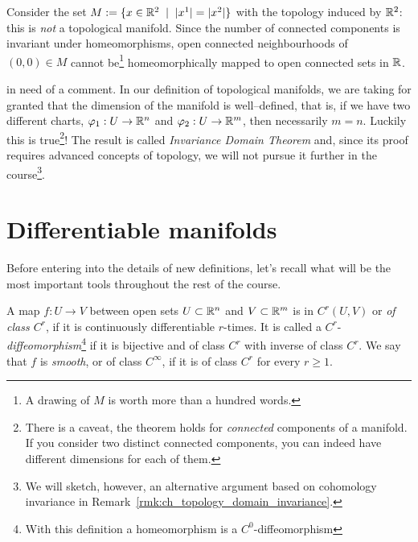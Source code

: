 \begin{example}
  Consider the set $M := \{ x\in\mathbb{R}^2 \;\mid\; |x^1| = |x^2| \}$ with the topology induced by $\mathbb{R}^2$:
  this is \emph{not} a topological manifold.
  Since the number of connected components is invariant under homeomorphisms, open connected neighbourhoods of $(0,0)\in M$ cannot be\footnote{A drawing of $M$ is worth more than a hundred words.} homeomorphically mapped to open connected sets in $\mathbb{R}$.
\end{example}

 in need of a comment.
In our definition of topological manifolds, we are taking for granted that the dimension of the manifold is well--defined, that is, if we have two different charts, $\varphi_1: U \to \mathbb{R}^n$ and $\varphi_2: U \to \mathbb{R}^m$, then necessarily $m=n$. Luckily this is true\footnote{There is a caveat, the theorem holds for \emph{connected} components of a manifold. If you consider two distinct connected components, you can indeed have different dimensions for each of them.}! The result is called \emph{Invariance Domain Theorem} and, since its proof requires advanced concepts of topology, we will not pursue it further in the course\footnote{We will sketch, however, an alternative argument based on cohomology invariance in Remark~\ref{rmk:ch_topology_domain_invariance}.}.

\section{Differentiable manifolds}

Before entering into the details of new definitions, let's recall what will be the most important tools throughout the rest of the course.

\begin{definition}
  A map $f: U \to V$ between open sets $U\subset\mathbb{R}^n$ and $V\subset\mathbb{R}^m$ is in $C^r(U,V)$ or \emph{of class $C^r$}, if it is continuously differentiable $r$-times.
  It is called a $C^r$-\emph{diffeomorphism}\footnote{With this definition a homeomorphism is a $C^0$-diffeomorphism} if it is bijective and of class $C^r$ with inverse of class $C^r$.
  We say that $f$ is \emph{smooth}, or of class $C^\infty$, if it is of class $C^r$ for every $r \geq 1$.
\end{definition}

